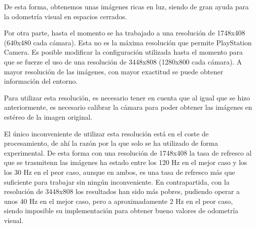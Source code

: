 De esta forma, obtenemos unas imágenes ricas en luz, siendo de gran ayuda para
la odometría visual en espacios cerrados.

Por otra parte, hasta el momento se ha trabajado a una resolución de 1748x408
(640x480 cada cámara). Esta no es la máxima resolución que permite PlayStation
Camera. Es posible modificar la configuración utilizada hasta el momento para
que se fuerze el uso de una resolución de 3448x808 (1280x800 cada cámara). A
mayor resolución de las imágenes, con mayor exactitud se puede obtener
información del entorno.

Para utilizar esta resolución, es necesario tener en cuenta que al igual que se
hizo anteriormente, es necesario calibrar la cámara para poder obtener las
imágenes en estéreo de la imagen original.

El único inconveniente de utilizar esta resolución está en el coste de
procesamiento, de ahí la razón por la que solo se ha utilizado de forma
experimental. De esta forma con una resolución de 1748x408 la tasa de refresco
al que se trasmitenn las imágenes ha estado entre los 120 Hz en el mejor caso y
los los 30 Hz en el peor caso, aunque en ambos, es una tasa de refresco más que
suficiente para trabajar sin ningún inconveniente. En contrapartida, con la
resolución de 3448x808 los resultados han sido más pobres, pudiendo operar a
unos 40 Hz en el mejor caso, pero a aproximadamente 2 Hz en el peor caso, siendo
imposible su implementación para obtener bueno valores de odometría visual.

